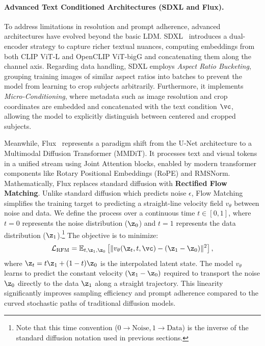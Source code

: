 \documentclass[../../book-main.tex]{subfiles}
\begin{document}
\paragraph{Advanced Text Conditioned Architectures (SDXL and Flux).}
To address limitations in resolution and prompt adherence, advanced
architectures have evolved beyond the basic LDM.
SDXL~\citep{podell2023sdxl} introduces a dual-encoder strategy to
capture richer textual nuances, computing embeddings from both CLIP
ViT-L and OpenCLIP ViT-bigG and concatenating them along the channel
axis. Regarding data handling, SDXL employs \textit{Aspect Ratio
Bucketing}, grouping training images of similar aspect ratios into
batches to prevent the model from learning to crop subjects
arbitrarily. Furthermore, it implements \textit{Micro-Conditioning},
where metadata such as image resolution and crop coordinates are
embedded and concatenated with the text condition $\vc$, allowing the
model to explicitly distinguish between centered and cropped subjects.

Meanwhile, Flux~\citep{flux2024} represents a paradigm shift from the
U-Net architecture to a Multimodal Diffusion Transformer (MMDiT). It
processes text and visual tokens in a unified stream using Joint
Attention blocks, enabled by modern transformer components like
Rotary Positional Embeddings (RoPE) and RMSNorm. Mathematically, Flux
replaces standard diffusion with \textbf{Rectified Flow Matching}.
Unlike standard diffusion which predicts noise $\epsilon$, Flow
Matching simplifies the training target to predicting a straight-line
velocity field $v_\theta$ between noise and data. We define the
process over a continuous time $t \in [0, 1]$, where $t=0$ represents
the noise distribution ($\z_0$) and $t=1$ represents the data
distribution ($\z_1$).\footnote{Note that this time convention ($0
\to \text{Noise}, 1 \to \text{Data}$) is the inverse of the standard
diffusion notation used in previous sections.} The objective is to minimize:
\begin{equation}
\mathcal{L}_{\text{RFM}} = \mathbb{E}_{t, \z_1, \z_0} \left[ \|
v_\theta(\z_t, t, \vc) - (\z_1 - \z_0) \|^2 \right],
\end{equation}
where $\z_t = t \z_1 + (1-t) \z_0$ is the interpolated latent state.
The model $v_\theta$ learns to predict the constant velocity $(\z_1 -
\z_0)$ required to transport the noise $\z_0$ directly to the data
$\z_1$ along a straight trajectory. This linearity significantly
improves sampling efficiency and prompt adherence compared to the
curved stochastic paths of traditional diffusion models.
\end{document}

